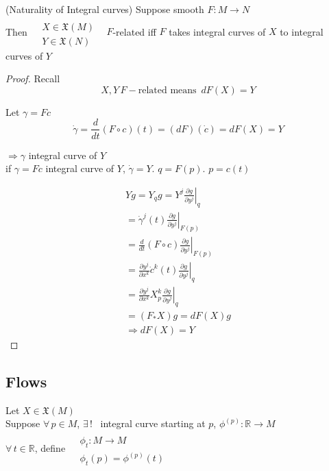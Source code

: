 \begin{proposition}[9.6] (Naturality of Integral curves)
  Suppose smooth $F: M \to N$ \\
  \quad Then $\begin{aligned} & \quad \\ 
    & X \in \mathfrak{X}(M) \\
    & Y \in \mathfrak{X}(N) \end{aligned}$ \quad \, $F$-related iff $F$ takes integral curves of $X$ to integral curves of $Y$
\end{proposition}

\begin{proof}
Recall 
\[
X,Y \, F-\text{related means } \, dF(X) =Y
\]

Let $\gamma = Fc$ 
\[
\dot{\gamma} = \frac{d}{dt} (F\circ c)(t) = (dF)(\dot{c}) = dF(X) = Y
\]

$\Longrightarrow \gamma $ integral curve of $Y$ \\

if $\gamma = Fc$ integral curve of $Y$, $\dot{\gamma} = Y$.  \quad $q = F(p)$.  $p=c(t)$

\[
\begin{gathered}
  Yg= Y_qg = Y^j \left. \frac{ \partial g}{ \partial y^j } \right|_q \\
  = \dot{\gamma}^j(t) \left. \frac{ \partial g}{ \partial y^j } \right|_{F(p)} \\
  = \frac{d}{dt} (F\circ c ) \left. \frac{ \partial g}{ \partial y^j } \right|_{F(p)} \\
  = \frac{ \partial y^j}{ \partial x^k } \dot{c}^k(t) \left. \frac{ \partial g}{ \partial y^j } \right|_q \\
  = \frac{ \partial y^j}{ \partial x^k} X^k_p \left. \frac{ \partial g}{ \partial y^j } \right|_q \\
  = (F_* X)g = dF(X)g \\
\Longrightarrow dF(X) = Y
\end{gathered}
\]
\end{proof}


\subsection*{Flows }


Let $X \in \mathfrak{X}(M)$ \\
Suppose $\forall \, p \in M$, $\exists \, !$ \, integral curve starting at $p$, $\phi^{(p)}: \mathbb{R} \to M$ \\
$\forall \, t \in \mathbb{R}$, define $\begin{aligned} & \quad \\
  & \phi_t: M \to M \\
  & \phi_t(p) = \phi^{(p)}(t) \end{aligned}$

